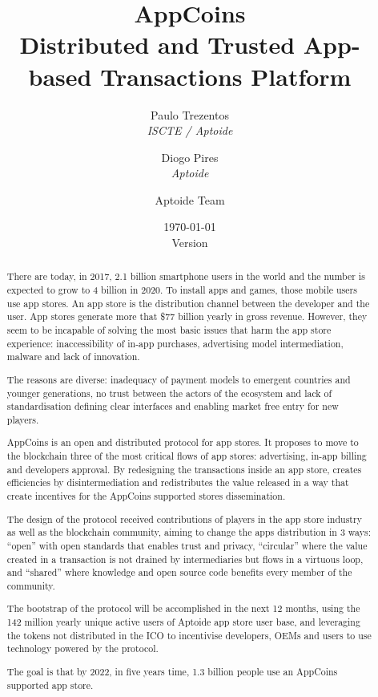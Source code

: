 \documentclass[12pt, a4paper, titlepage]{article}
\title{AppCoins\\ Distributed and Trusted App-based Transactions Platform}
\author{\small Paulo Trezentos  \\
  {\em  ISCTE / Aptoide}  \\
  \and 
\small  Diogo Pires \\
  {\em Aptoide} \\
  \and
  Aptoide Team
  }
\date{\today\\\normalsize Version \versionnumber}
\begin{document}
\maketitle


\begin{abstract}

There are today, in 2017, 2.1 billion smartphone users in the world and the number is expected to grow to  4 billion in 2020. To install apps and games, those mobile users use app stores. An app store is the distribution channel between the developer and the user. App stores generate more that \$77 billion yearly in gross revenue.  However, they seem to be incapable of solving the most basic issues that harm the app store experience: inaccessibility of in-app purchases, advertising model intermediation, malware and lack of innovation.

The reasons are diverse: inadequacy of payment models to emergent countries and younger generations, no trust between the actors of the ecosystem and lack of standardisation defining clear interfaces and enabling market free entry for new players.

AppCoins is an open and distributed protocol for app stores. It proposes to move to the blockchain three of the most critical flows of app stores: advertising, in-app billing and developers approval. By redesigning the transactions inside an app store, creates efficiencies by disintermediation and redistributes the value released in a way that create incentives for the AppCoins supported stores dissemination.

The design of the protocol received contributions of players in the app store industry as well as the blockchain community, aiming to change the apps distribution in 3 ways: ``open'' with open standards that enables trust and privacy, ``circular'' where the value created in a transaction is not drained by intermediaries but flows in a virtuous loop, and ``shared'' where knowledge and open source code benefits every member of the community.

The bootstrap of the protocol will be accomplished in the next 12 months, using the 142 million yearly unique active users of Aptoide app store user base, and leveraging the tokens not distributed in the ICO to incentivise developers, OEMs and users to use technology powered by the protocol.

The goal is that by 2022, in five years time, 1.3 billion people use an AppCoins supported app store.


\end{abstract}
\end{document}
